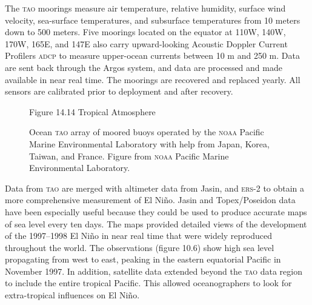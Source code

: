 The \textsc{tao} moorings measure air temperature, relative humidity,
surface wind velocity, sea-surface temperatures, and subsurface
temperatures from 10 meters down to 500 meters. Five moorings located
on the equator at 110\degrees W, 140\degrees W, 170\degrees W,
165\degrees E, and 147\degrees E also carry upward-looking Acoustic
Doppler Current Profilers \textsc{adcp} to measure upper-ocean
currents between 10 m and 250 m.  Data are sent back through the Argos
system, and data are processed and made available
in near real time. The moorings are recovered and replaced yearly.
All sensors are calibrated prior to deployment and after recovery.

\begin{figure}[t!]
\footnotesize
Figure 14.14 Tropical Atmosphere \rule{0mm}{4ex}Ocean \textsc{tao}
array of moored buoys operated by the \textsc{noaa} Pacific Marine
Environmental Laboratory with help from Japan, Korea, Taiwan, and
France. Figure from \textsc{noaa} Pacific Marine Environmental
Laboratory.

\label{fig:TaoArray}
\vspace{-3ex}
\end{figure}

Data from \textsc{tao} are merged with altimeter data from Jasin, and
\textsc{ers}-2 to obtain a more comprehensive
measurement of El Ni\~{n}o. Jasin and
Topex/Poseidon data have been especially useful
because they could be used to produce accurate maps of sea level every
ten days. The maps provided detailed views of the development of the
1997--1998 El Ni\~{n}o in near real time that were widely reproduced
throughout the world. The observations (figure 10.6) show high sea
level propagating from west to east, peaking in the eastern equatorial
Pacific in November 1997. In addition, satellite data extended beyond
the \textsc{tao} data region to include the entire tropical
Pacific. This allowed oceanographers to look for extra-tropical
influences on El Ni\~{n}o.

